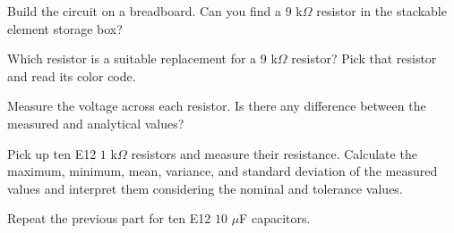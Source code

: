 \documentclass[11pt]{article}
\begin{document}
\begin{question}
    \begin{subquestion}{Build the circuit on a breadboard. Can you find a $9$ k$\Omega$ resistor in the stackable element storage box? }
        \answer{
        }
    \end{subquestion}

    \begin{subquestion}{Which resistor is a suitable replacement for a $9$ k$\Omega$ resistor? Pick that resistor and read its color code.}
        \answer{}
    \end{subquestion}

    \begin{subquestion}{Measure the voltage across each resistor. Is there any difference between the measured and analytical values?}
        \answer{}
    \end{subquestion}

\end{question}



\begin{question}


    \begin{subquestion}{Pick up ten E12 $1$ k$\Omega$ resistors and measure their resistance. Calculate the maximum, minimum, mean, variance, and standard deviation of the measured values and interpret them considering the nominal and tolerance values. }
        \answer{}
    \end{subquestion}

    \begin{subquestion}{Repeat the previous part for ten E12 $10$ $\mu$F capacitors. }
        \answer{}
    \end{subquestion}

\end{question}

\end{document}
